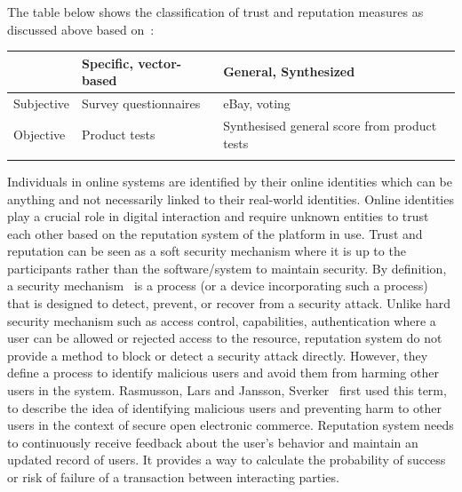 The table below shows the classification of trust and reputation measures as
discussed above based on~\cite{ josang2007survey}: 
 \begin{center}\label{table:classificationTrust}
	\begin{tabularx}{\textwidth }{|X| X| X| }
		\hline
		 & Specific, vector-based & General, Synthesized \\
		 \hline
		Subjective & Survey questionnaires & eBay, voting \\
		\hline
		Objective & Product tests & Synthesised general score from product tests \\
		\hline
		\caption{Classification of trust and reputation measures.}
	\end{tabularx}
\end{center}
Individuals in online systems are identified by their online identities which
can be anything and not necessarily linked to their real-world identities.
Online identities play a crucial role in digital interaction and require
unknown entities to trust each other based on the reputation system of the
platform in use. Trust and reputation can be seen as a soft security mechanism
where it is up to the participants rather than the software/system to maintain
security. By definition, a security mechanism~\cite{stallings2017cryptography}
is a process (or a device incorporating such a process) that is designed to
detect, prevent, or recover from a security attack. Unlike hard security
mechanism such as access control, capabilities, authentication where a user can
be allowed or rejected access to the resource, reputation system do not provide
a method to block or detect a security attack directly. However, they define a
process to identify malicious users and avoid them from harming other users in
the system. Rasmusson, Lars and Jansson, Sverker~\cite{rasmusson1996simulated}
first used this term, to describe the idea of identifying malicious users and
preventing harm to other users in the context of secure open electronic
commerce. Reputation system needs to continuously receive feedback about the
user's behavior and maintain an updated record of users. It provides a way to
calculate the probability of success or risk of failure of a transaction
between interacting parties. 


